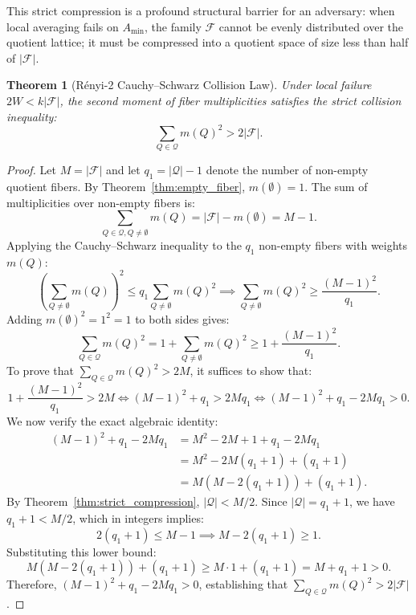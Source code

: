 \documentclass[11pt,a4paper]{article}
\theoremstyle{plain}
\newtheorem{theorem}{Theorem}[section]
\theoremstyle{definition}
\theoremstyle{remark}
\newcommand{\F}{\mathcal{F}}
\newcommand{\Q}{\mathcal{Q}}
\begin{document}
This strict compression is a profound structural barrier for an adversary: when local averaging fails on $A_{\min}$, the family $\F$ cannot be evenly distributed over the quotient lattice; it must be compressed into a quotient space of size less than half of $|\F|$.

\begin{theorem}[Rényi-2 Cauchy--Schwarz Collision Law]\label{thm:renyi_collision}
Under local failure $2W < k|\F|$, the second moment of fiber multiplicities satisfies the strict collision inequality:
\begin{equation}
\sum_{Q \in \Q} m(Q)^2 > 2 |\F|.
\end{equation}
\end{theorem}
\begin{proof}
Let $M = |\F|$ and let $q_1 = |\Q| - 1$ denote the number of non-empty quotient fibers. By Theorem~\ref{thm:empty_fiber}, $m(\emptyset) = 1$. The sum of multiplicities over non-empty fibers is:
\begin{equation}
\sum_{Q \in \Q, Q \ne \emptyset} m(Q) = |\F| - m(\emptyset) = M - 1.
\end{equation}
Applying the Cauchy--Schwarz inequality to the $q_1$ non-empty fibers with weights $m(Q)$:
\begin{equation}
\left( \sum_{Q \ne \emptyset} m(Q) \right)^2 \le q_1 \sum_{Q \ne \emptyset} m(Q)^2 \implies \sum_{Q \ne \emptyset} m(Q)^2 \ge \frac{(M - 1)^2}{q_1}.
\end{equation}
Adding $m(\emptyset)^2 = 1^2 = 1$ to both sides gives:
\begin{equation}
\sum_{Q \in \Q} m(Q)^2 = 1 + \sum_{Q \ne \emptyset} m(Q)^2 \ge 1 + \frac{(M - 1)^2}{q_1}.
\end{equation}
To prove that $\sum_{Q \in \Q} m(Q)^2 > 2M$, it suffices to show that:
\begin{equation}
1 + \frac{(M - 1)^2}{q_1} > 2M \iff (M - 1)^2 + q_1 > 2M q_1 \iff (M - 1)^2 + q_1 - 2M q_1 > 0.
\end{equation}
We now verify the exact algebraic identity:
\begin{align}
(M - 1)^2 + q_1 - 2M q_1 &= M^2 - 2M + 1 + q_1 - 2M q_1 \nonumber \\
&= M^2 - 2M(q_1 + 1) + (q_1 + 1) \nonumber \\
&= M(M - 2(q_1 + 1)) + (q_1 + 1).
\end{align}
By Theorem~\ref{thm:strict_compression}, $|\Q| < M / 2$. Since $|\Q| = q_1 + 1$, we have $q_1 + 1 < M / 2$, which in integers implies:
\begin{equation}
2(q_1 + 1) \le M - 1 \implies M - 2(q_1 + 1) \ge 1.
\end{equation}
Substituting this lower bound:
\begin{equation}
M(M - 2(q_1 + 1)) + (q_1 + 1) \ge M \cdot 1 + (q_1 + 1) = M + q_1 + 1 > 0.
\end{equation}
Therefore, $(M - 1)^2 + q_1 - 2M q_1 > 0$, establishing that $\sum_{Q \in \Q} m(Q)^2 > 2|\F|$.
\end{proof}
\end{document}
